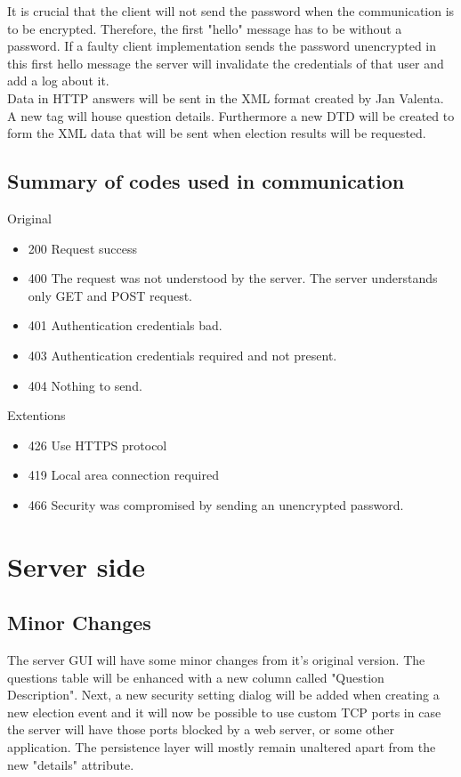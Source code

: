 \documentclass[11pt,twoside,a4paper]{book}
\begin{document}
It is crucial that the client will not send the password when the communication is to be encrypted. Therefore, the first "hello" message has to be without a password. If a faulty client implementation sends the password unencrypted in this first hello message the server will invalidate the credentials of that user and add a log about it.\\

Data in HTTP answers will be sent in the XML format created by Jan Valenta. A new tag will house question details. Furthermore a new DTD will be created to form the XML data that will be sent when election results will be requested.

\subsection{Summary of codes used in communication}
Original\cite{bakalarkaJV}
\begin{itemize}
\item 200 Request success
\item 400 The request was not understood by the server. The server understands only GET and POST request.
\item 401 Authentication credentials bad.
\item 403 Authentication credentials required and not present.
\item 404 Nothing to send.\\
\end{itemize}

Extentions
\begin{itemize}
\item 426 Use HTTPS protocol
\item 419 Local area connection required
\item 466 Security was compromised by sending an unencrypted password.
\end{itemize}
\section{Server side}
\subsection{Minor Changes}
The server GUI will have some minor changes from it's original version. The questions table will be enhanced with a new column called "Question Description". Next, a new security setting dialog will be added when creating a new election event and it will now be possible to use custom TCP ports in case the server will  have those ports blocked by a web server, or some other application. The persistence layer will mostly remain unaltered apart from the new "details" attribute.
\end{document}
